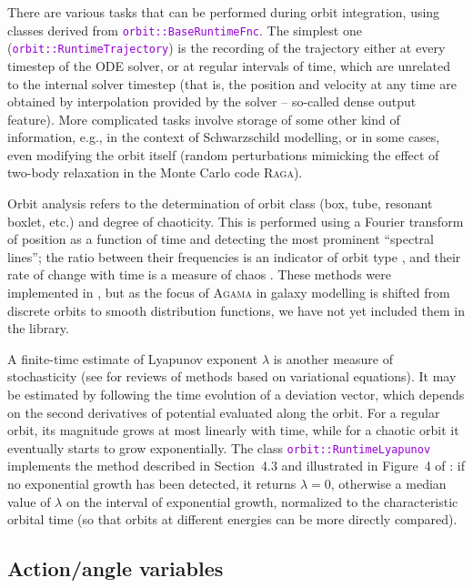 \documentclass[12pt]{article}
\newcommand{\Agama}{\textsc{Agama}\xspace}
\newcommand{\ttt}[1]{\textcolor{darkviolet}{\texttt{#1}}}
\begin{document}
There are various tasks that can be performed during orbit integration, using classes derived from \ttt{orbit::BaseRuntimeFnc}. The simplest one (\ttt{orbit::RuntimeTrajectory}) is the recording of the trajectory either at every timestep of the ODE solver, or at regular intervals of time, which are unrelated to the internal solver timestep (that is, the  position and velocity at any time are obtained by interpolation provided by the solver -- so-called dense output feature). More complicated tasks involve storage of some other kind of information, e.g., in the context of Schwarzschild modelling, or in some cases, even modifying the orbit itself (random perturbations mimicking the effect of two-body relaxation in the Monte Carlo code \textsc{Raga}).

Orbit analysis refers to the determination of orbit class (box, tube, resonant boxlet, etc.) and degree of chaoticity. This is performed using a Fourier transform of position as a function of time and detecting the most prominent ``spectral lines''; the ratio between their frequencies is an indicator of orbit type \cite{BinneySpergel1984, CarpinteroAguilar1998}, and their rate of change with time is a measure of chaos \cite{ValluriMerritt1998}. These methods were implemented in \cite{Vasiliev2013}, but as the focus of \Agama in galaxy modelling is shifted from discrete orbits to smooth distribution functions, we have not yet included them in the library.

A finite-time estimate of Lyapunov exponent $\lambda$ is another measure of stochasticity (see \cite{Carpintero2014, Skokos2010} for reviews of methods based on variational equations). It may be estimated by following the time evolution of a deviation vector, which depends on the second derivatives of potential evaluated along the orbit. For a regular orbit, its magnitude grows at most linearly with time, while for a chaotic orbit it eventually starts to grow exponentially. The class \ttt{orbit::RuntimeLyapunov} implements the method described in Section~4.3 and illustrated in Figure~4 of \cite{Vasiliev2013}: if no exponential growth has been detected, it returns $\lambda=0$, otherwise a median value of $\lambda$ on the interval of exponential growth, normalized to the characteristic orbital time (so that orbits at different energies can be more directly compared).


\subsection{Action/angle variables}  \label{sec:ActionAngle}
\end{document}
